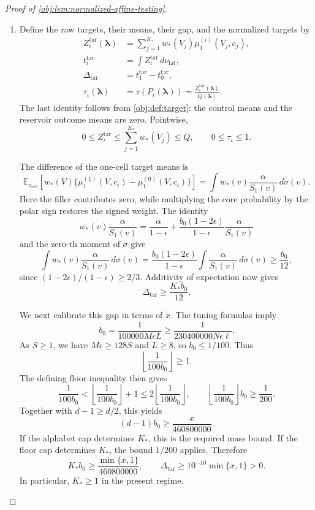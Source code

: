 \begin{proof}[Proof of \cref{obj:lem:normalized-affine-testing}]
\begin{enumerate}
\item
Define the raw targets, their means, their gap, and the normalized targets by
\[
\begin{aligned}
Z_\iota^{\mathrm{tar}}(\boldsymbol\lambda)
&=\sum_{j=1}^{K_*}w_*(V_j)\mu_1^{(\iota)}(V_j,c_j),\\
t_\iota^{\mathrm{tar}}
&=\int Z_\iota^{\mathrm{tar}}\,d\nu_{\mathrm{lat}},\\
\Delta_{\mathrm{tar}}&=t_1^{\mathrm{tar}}-t_0^{\mathrm{tar}},\\
\tau_\iota(\boldsymbol\lambda)
&=\tau(P_\iota(\boldsymbol\lambda))
=\frac{Z_\iota^{\mathrm{tar}}(\boldsymbol\lambda)}{Q(\boldsymbol\lambda)}.
\end{aligned}
\]
The last identity follows from \cref{obj:def:target}: the control means and the reservoir outcome means are zero. Pointwise,
\[
0\le Z_\iota^{\mathrm{tar}}
\le\sum_{j=1}^{K_*}w_*(V_j)\le Q,
\qquad
0\le\tau_\iota\le1.
\]

The difference of the one-cell target means is
\[
\mathbb E_{\nu_{\mathrm{cell}}}
\left[w_*(V)\{\mu_1^{(1)}(V,c_i)-\mu_1^{(0)}(V,c_i)\}\right]
=\int w_*(v)\frac{\alpha}{S_1(v)}\,d\sigma(v).
\]
Here the filler contributes zero, while multiplying the core probability by the polar sign restores the signed weight. The identity
\[
w_*(v)\frac{\alpha}{S_1(v)}
=\frac{\alpha}{1-\epsilon}
+\frac{b_0(1-2\epsilon)}{1-\epsilon}
  \frac{\alpha}{S_1(v)}
\]
and the zero-th moment of \(\sigma\) give
\[
\int w_*(v)\frac{\alpha}{S_1(v)}\,d\sigma(v)
=\frac{b_0(1-2\epsilon)}{1-\epsilon}
 \int\frac{\alpha}{S_1(v)}\,d\sigma(v)
\ge\frac{b_0}{12},
\]
since \((1-2\epsilon)/(1-\epsilon)\ge2/3\). Additivity of expectation now gives
\[
\Delta_{\mathrm{tar}}\ge\frac{K_*b_0}{12}.
\]

We next calibrate this gap in terms of \(x\). The tuning formulas imply
\[
b_0=\frac1{100000M\epsilon L}
\ge\frac1{230400000N\epsilon\ell}.
\]
As \(S\ge1\), we have \(M\epsilon\ge128S\) and \(L\ge8\), so \(b_0\le1/100\). Thus
\[
\left\lfloor\frac1{100b_0}\right\rfloor\ge1.
\]
The defining floor inequality then gives
\[
\frac1{100b_0}
<
\left\lfloor\frac1{100b_0}\right\rfloor+1
\le2\left\lfloor\frac1{100b_0}\right\rfloor,
\qquad
\left\lfloor\frac1{100b_0}\right\rfloor b_0\ge\frac1{200}.
\]
Together with \(d-1\ge d/2\), this yields
\[
(d-1)b_0\ge\frac{x}{460800000}.
\]
If the alphabet cap determines \(K_*\), this is the required mass bound. If the floor cap determines \(K_*\), the bound \(1/200\) applies. Therefore
\[
K_*b_0\ge\frac{\min\{x,1\}}{460800000},
\qquad
\Delta_{\mathrm{tar}}\ge10^{-10}\min\{x,1\}>0.
\]
In particular, \(K_*\ge1\) in the present regime.


\end{enumerate}
\end{proof}

